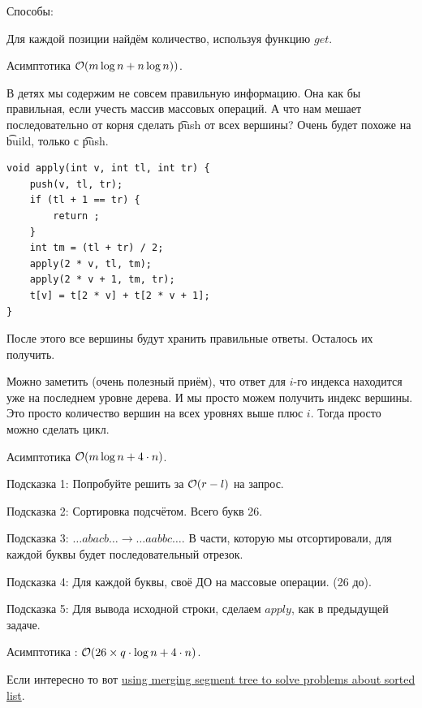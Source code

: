 \down

Способы:

\up \up
\begin{MyList}[0pt]
	\item Для каждой позиции найдём количество, используя функцию $get$.
	
	Асимптотика $\mathcal{O}(m \log n + n \log n))$.
	
	\item  В детях мы содержим не совсем правильную информацию. Она как бы правильная, если учесть массив массовых операций. А что нам мешает последовательно от корня сделать \t{push} от всех вершины? Очень будет похоже на \t{build}, только с \t{push}.
	
\begin{verbatim}
void apply(int v, int tl, int tr) {
	push(v, tl, tr);
	if (tl + 1 == tr) {
		return ;
	}
	int tm = (tl + tr) / 2;
	apply(2 * v, tl, tm);
	apply(2 * v + 1, tm, tr);
	t[v] = t[2 * v] + t[2 * v + 1];
}
\end{verbatim}

	После этого все вершины будут хранить правильные ответы. Осталось их получить.
	
	Можно заметить (очень полезный приём), что ответ для $i$-го индекса находится уже на последнем уровне дерева. И мы просто можем получить индекс вершины. Это просто количество вершин на всех уровнях выше плюс $i$. Тогда просто можно сделать цикл.
	
	Асимптотика $\mathcal{O}(m \log n + 4 \cdot n)$.
\end{MyList}


\href{https://codeforces.com/problemset/problem/558/E}{}

Подсказка 1: Попробуйте решить за $\mathcal{O}(r - l)$ на запрос.

Подсказка 2: Сортировка подсчётом. Всего букв 26.

Подсказка 3: $\dots abacb \dots  \rightarrow \dots aabbc \dots $. В части, которую мы отсортировали, для каждой буквы будет последовательный отрезок.

Подсказка 4: Для каждой буквы, своё ДО на массовые операции. (26 до).

Подсказка 5: Для вывода исходной строки, сделаем $apply$, как в предыдущей задаче.

Асимптотика : $\mathcal{O}(26 \times q \cdot \log n + 4 \cdot n)$.

Если интересно то вот \href{https://codeforces.com/blog/entry/49446}{using merging segment tree to solve problems about sorted list}.

